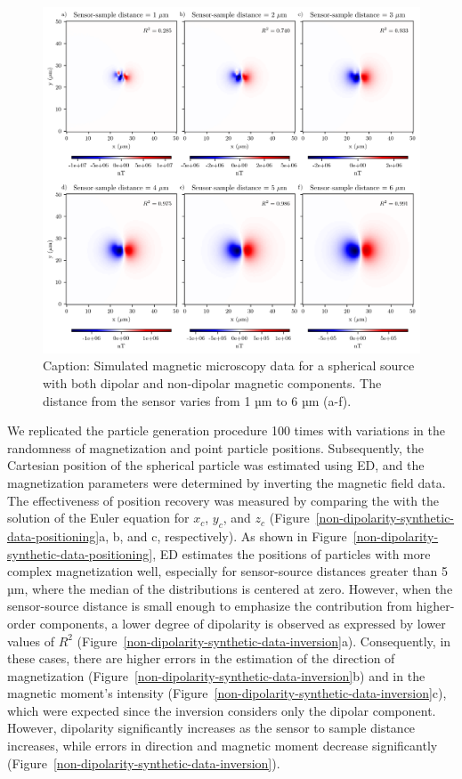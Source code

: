 \begin{figure}[tb!]
  \centering
  \includegraphics[width=1\linewidth]{figures/non-dipolarity-synthetic.png}
  \caption{Caption: Simulated magnetic microscopy data for a spherical source with both dipolar and non-dipolar magnetic components. The distance from the sensor varies from 1 µm to 6 µm (a-f).}
  \label{non-dipolarity-synthetic-data}
\end{figure}

We replicated the particle generation procedure 100 times with variations in the randomness of magnetization and point particle positions. Subsequently, the Cartesian position of the spherical particle was estimated using ED, and the magnetization parameters were determined by inverting the magnetic field data. The effectiveness of position recovery was measured by comparing the \DIFdelbegin {}\DIFdelend \DIFaddbegin {}\DIFaddend with the solution of the Euler equation for $x_c$, $y_c$, and $z_c$ (Figure~\ref{non-dipolarity-synthetic-data-positioning}a, b, and c, respectively). As shown in Figure~\ref{non-dipolarity-synthetic-data-positioning}, ED estimates the positions of particles with more complex magnetization well, especially for sensor-source distances greater than 5 µm, where the median of the distributions is centered at zero. However, when the sensor-source distance is small enough to emphasize the contribution from higher-order components, a lower degree of dipolarity is observed as expressed by lower values of $R^2$ (Figure~\ref{non-dipolarity-synthetic-data-inversion}a). Consequently, in these cases, there are higher errors in the estimation of the direction of magnetization (Figure~\ref{non-dipolarity-synthetic-data-inversion}b) and in the magnetic moment's intensity (Figure~\ref{non-dipolarity-synthetic-data-inversion}c), which were expected since the inversion considers only the dipolar component. However, dipolarity significantly increases as the sensor to sample distance increases, while errors in direction and magnetic moment decrease significantly (Figure~\ref{non-dipolarity-synthetic-data-inversion}).

